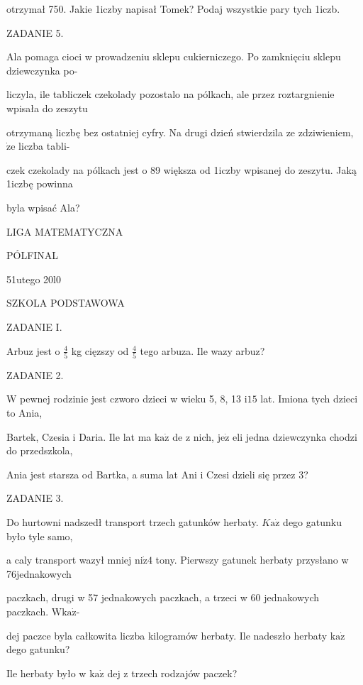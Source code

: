 \documentclass[a4paper,12pt]{article}
\begin{document}
otrzymał 750. Jakie 1iczby napisał Tomek? Podaj wszystkie pary tych 1iczb.

ZADANIE 5.

Ala pomaga cioci w prowadzeniu sklepu cukierniczego. Po zamknięciu sklepu dziewczynka po-

liczyla, ile tabliczek czekolady pozostalo na pólkach, ale przez roztargnienie wpisała do zeszytu

otrzymaną liczbę bez ostatniej cyfry. Na drugi dzień stwierdzila ze zdziwieniem, $\dot{\mathrm{z}}\mathrm{e}$ liczba tabli-

czek czekolady na pólkach jest o 89 większa od 1iczby wpisanej do zeszytu. Jaką 1iczbę powinna

byla wpisać Ala?






LIGA MATEMATYCZNA

PÓLFINAL

51utego 20l0

SZKOLA PODSTAWOWA

ZADANIE I.

Arbuz jest o $\displaystyle \frac{4}{5}$ kg cięzszy od $\displaystyle \frac{4}{5}$ tego arbuza. Ile wazy arbuz?

ZADANIE 2.

$\mathrm{W}$ pewnej rodzinie jest czworo dzieci w wieku 5, 8, 13 $\mathrm{i} 15$ lat. Imiona tych dzieci to Ania,

Bartek, Czesia i Daria. Ile lat ma $\mathrm{k}\mathrm{a}\dot{\mathrm{z}}$ de z nich, $\mathrm{j}\mathrm{e}\dot{\mathrm{z}}$ eli jedna dziewczynka chodzi do przedszkola,

Ania jest starsza od Bartka, a suma lat Ani i Czesi dzieli się przez 3?

ZADANIE 3.

Do hurtowni nadszedł transport trzech gatunków herbaty. $K\mathrm{a}\dot{\mathrm{z}}$ dego gatunku było tyle samo,

a caly transport wazył mniej $\mathrm{n}\mathrm{i}\dot{\mathrm{z}}4$ tony. Pierwszy gatunek herbaty przysłano w 76jednakowych

paczkach, drugi w 57 jednakowych paczkach, a trzeci w 60 jednakowych paczkach. $\mathrm{W}\mathrm{k}\mathrm{a}\dot{\mathrm{z}}$-

dej paczce byla całkowita liczba kilogramów herbaty. Ile nadeszło herbaty $\mathrm{k}\mathrm{a}\dot{\mathrm{z}}$ dego gatunku?

Ile herbaty było w $\mathrm{k}\mathrm{a}\dot{\mathrm{z}}$ dej z trzech rodzajów paczek?
\end{document}
